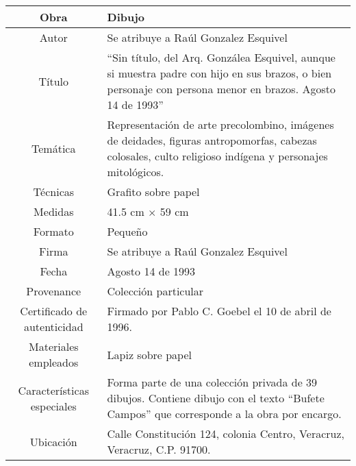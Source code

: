 \documentclass[10pt,letter]{report}
\begin{document}
\begin{table}[H]
\centering
\begin{tabular}{|c|m{}|}
\hline
Obra& Dibujo	\\
\hline
Autor & Se atribuye a Ra\'ul Gonzalez Esquivel\\
\hline
T\'itulo & ``Sin t\'itulo, del Arq. Gonz\'alea Esquivel, aunque si muestra padre con hijo en sus brazos, o bien personaje con persona menor en brazos. Agosto 14 de 1993'' \\
\hline
Tem\'atica & Representaci\'on de arte precolombino, im\'agenes de deidades, figuras antropomorfas, cabezas colosales, culto religioso ind\'igena y personajes mitol\'ogicos.\\
\hline
T\'ecnicas &Grafito sobre papel \\
\hline
Medidas & 41.5 cm $\times$ 59 cm \\
\hline
 Formato & Peque\~no \\
 \hline
 Firma & Se atribuye a Ra\'ul Gonzalez Esquivel\\ 
 \hline
  Fecha &  Agosto 14 de 1993\\
 \hline
 Provenance & Colecci\'on particular\\
 \hline
 Certificado de autenticidad& Firmado por Pablo C. Goebel el 10 de abril de 1996.  \\
 \hline 
  Materiales empleados & Lapiz sobre papel\\
 \hline
 Caracter\'isticas especiales & Forma parte de una colecci\'on privada de 39 dibujos. 
Contiene dibujo con el texto ``Bufete Campos'' que corresponde a la obra por encargo. \\
\hline 
Ubicaci\'on & Calle Constituci\'on 124, colonia Centro, Veracruz, Veracruz, C.P. 91700.\\
\hline

\end{tabular}
\end{table}
\end{document}
